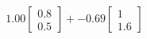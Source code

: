 \documentclass[preview]{standalone}
\begin{document}
\begin{align*}
1.00 \begin{bmatrix} 0.8 \\ 0.5 \end{bmatrix} + -0.69 \begin{bmatrix} 1 \\ 1.6 \end{bmatrix}
\end{align*}
\end{document}
